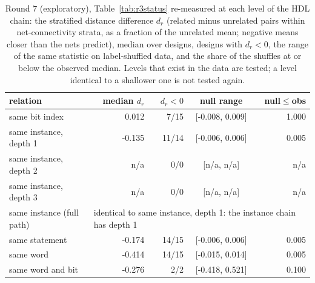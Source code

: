\begin{table}[t]
\caption{Round 7 (exploratory), Table~\ref{tab:r3status} re-measured at each level of the HDL chain: the stratified distance difference $d_r$ (related minus unrelated pairs within net-connectivity strata, as a fraction of the unrelated mean; negative means closer than the nets predict), median over designs, designs with $d_r<0$, the range of the same statistic on label-shuffled data, and the share of the shuffles at or below the observed median. Levels that exist in the data are tested; a level identical to a shallower one is not tested again.}
\label{tab:r7xi}
\centering\scriptsize
\begin{tabular}{@{}lrrcr@{}}
\toprule
relation & median $d_r$ & $d_r<0$ & null range & null$\le$obs \\
\midrule
same bit index & 0.012 & 7/15 & [-0.008, 0.009] & 1.000 \\
same instance, depth 1 & -0.135 & 11/14 & [-0.006, 0.006] & 0.005 \\
same instance, depth 2 & n/a & 0/0 & [n/a, n/a] & n/a \\
same instance, depth 3 & n/a & 0/0 & [n/a, n/a] & n/a \\
same instance (full path) & \multicolumn{4}{l}{identical to same instance, depth 1: the instance chain has depth 1} \\
same statement & -0.174 & 14/15 & [-0.006, 0.006] & 0.005 \\
same word & -0.414 & 14/15 & [-0.015, 0.014] & 0.005 \\
same word and bit & -0.276 & 2/2 & [-0.418, 0.521] & 0.100 \\
\bottomrule
\end{tabular}
\end{table}

